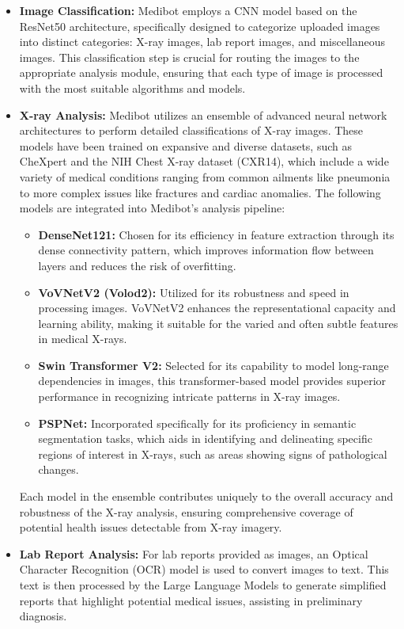 \begin{itemize}
    \item \textbf{Image Classification:} Medibot employs a CNN model based on the ResNet50 architecture, specifically designed to categorize uploaded images into distinct categories: X-ray images, lab report images, and miscellaneous images. This classification step is crucial for routing the images to the appropriate analysis module, ensuring that each type of image is processed with the most suitable algorithms and models.

\item \textbf{X-ray Analysis:} Medibot utilizes an ensemble of advanced neural network architectures to perform detailed classifications of X-ray images. These models have been trained on expansive and diverse datasets, such as CheXpert and the NIH Chest X-ray dataset (CXR14), which include a wide variety of medical conditions ranging from common ailments like pneumonia to more complex issues like fractures and cardiac anomalies. The following models are integrated into Medibot's analysis pipeline:

    \begin{itemize}
        \item \textbf{DenseNet121:} Chosen for its efficiency in feature extraction through its dense connectivity pattern, which improves information flow between layers and reduces the risk of overfitting.
        
        \item \textbf{VoVNetV2 (Volod2):} Utilized for its robustness and speed in processing images. VoVNetV2 enhances the representational capacity and learning ability, making it suitable for the varied and often subtle features in medical X-rays.
        
        \item \textbf{Swin Transformer V2:} Selected for its capability to model long-range dependencies in images, this transformer-based model provides superior performance in recognizing intricate patterns in X-ray images.
        
        \item \textbf{PSPNet:} Incorporated specifically for its proficiency in semantic segmentation tasks, which aids in identifying and delineating specific regions of interest in X-rays, such as areas showing signs of pathological changes.
    \end{itemize}

Each model in the ensemble contributes uniquely to the overall accuracy and robustness of the X-ray analysis, ensuring comprehensive coverage of potential health issues detectable from X-ray imagery.
    \item \textbf{Lab Report Analysis:} For lab reports provided as images, an Optical Character Recognition (OCR) model is used to convert images to text. This text is then processed by the Large Language Models to generate simplified reports that highlight potential medical issues, assisting in preliminary diagnosis.
\end{itemize}

